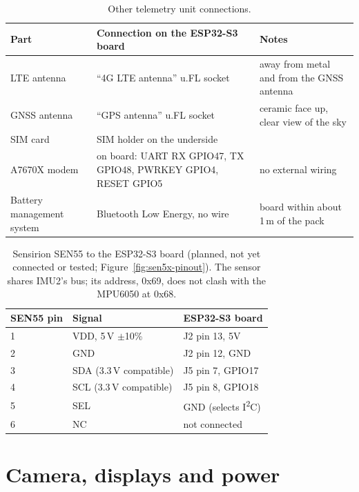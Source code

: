 \begin{table}[htbp]
\centering
\caption{Other telemetry unit connections.}
\label{tab:wiring-esp-other}
\begin{tabular}{|p{3.4cm}|p{4.6cm}|p{4.6cm}|}
\hline
\textbf{Part} & \textbf{Connection on the ESP32-S3 board} & \textbf{Notes} \\ \hline
LTE antenna & ``4G LTE antenna'' u.FL socket & away from metal and from the GNSS antenna \\ \hline
GNSS antenna & ``GPS antenna'' u.FL socket & ceramic face up, clear view of the sky \\ \hline
SIM card & SIM holder on the underside & \\ \hline
A7670X modem & on board: UART RX GPIO47, TX GPIO48, PWRKEY GPIO4, RESET GPIO5 & no external wiring \\ \hline
Battery management system & Bluetooth Low Energy, no wire & board within about 1\,m of the pack \\ \hline
\end{tabular}
\end{table}

\begin{table}[htbp]
\centering
\caption{Sensirion SEN55 to the ESP32-S3 board (planned, not yet connected or tested; Figure~\ref{fig:sen5x-pinout}). The sensor shares IMU2's bus; its address, 0x69, does not clash with the MPU6050 at 0x68.}
\label{tab:wiring-sen55}
\begin{tabular}{|l|l|l|}
\hline
\textbf{SEN55 pin} & \textbf{Signal} & \textbf{ESP32-S3 board} \\ \hline
1 & VDD, 5\,V $\pm$10\% & J2 pin 13, 5V \\ \hline
2 & GND & J2 pin 12, GND \\ \hline
3 & SDA (3.3\,V compatible) & J5 pin 7, GPIO17 \\ \hline
4 & SCL (3.3\,V compatible) & J5 pin 8, GPIO18 \\ \hline
5 & SEL & GND (selects I\textsuperscript{2}C) \\ \hline
6 & NC & not connected \\ \hline
\end{tabular}
\end{table}

\clearpage
\section{Camera, displays and power}

